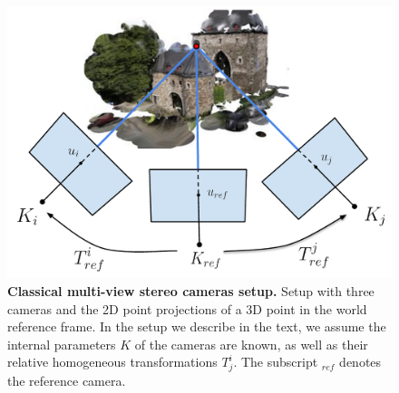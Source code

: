 \begin{figure}[H]
    \begin{center}
        \includegraphics[width=0.56\linewidth]{main/chapter03/data/depth/multiview_setup.pdf} 
    \end{center}
    \caption[Classical multi-view stereo cameras setup]{\textbf{Classical multi-view stereo cameras setup.} Setup with three cameras and the 2D point projections of a  3D point in the world reference frame. In the setup we describe in the text, we assume the internal parameters $K$ of the cameras are known, as well as their relative homogeneous transformations $T^{i}_{j}$. The subscript $_{ref}$ denotes the reference camera. } 
    \label{fig:depth:mvs-scheme}
\end{figure}


